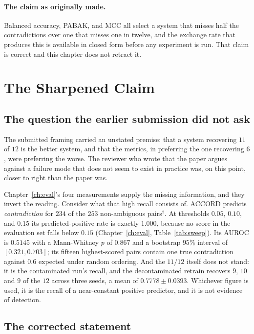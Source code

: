 \paragraph{The claim as originally made.} Balanced accuracy, PABAK, and MCC all
select a system that misses half the contradictions over one that misses one in
twelve, and the exchange rate that produces this is available in closed form
before any experiment is run. That claim is correct and this chapter does not
retract it.

\section{The Sharpened Claim}
\label{sec:met-sharpened}

\subsection{The question the earlier submission did not ask}

The submitted framing carried an unstated premise: that a system recovering $11$
of $12$ is the better system, and that the metrics, in preferring the one
recovering $6$, were preferring the worse. The reviewer who wrote that the paper
argues against a failure mode that does not seem to exist in practice was, on
this point, closer to right than the paper was.

Chapter~\ref{ch:eval}'s four measurements supply the missing information, and
they invert the reading. Consider what that high recall consists of. ACCORD
predicts \emph{contradiction} for $234$ of the $253$ non-ambiguous
pairs$^{\dagger}$. At thresholds $0.05$, $0.10$, and $0.15$ its
predicted-positive rate is exactly $1.000$, because no score in the evaluation
set falls below $0.15$ (Chapter~\ref{ch:eval}, Table~\ref{tab:sweep}). Its AUROC
is $0.5145$ with a Mann-Whitney $p$ of $0.867$ and a bootstrap $95\%$ interval of
$[0.321, 0.703]$; its fifteen highest-scored pairs contain one true contradiction
against $0.6$ expected under random ordering. And the $11/12$ itself does not
stand: it is the contaminated run's recall, and the decontaminated retrain
recovers $9$, $10$ and $9$ of the $12$ across three seeds, a mean of
$0.7778 \pm 0.0393$. Whichever figure is used, it is the recall of a
near-constant positive predictor, and it is not evidence of detection.

\subsection{The corrected statement}

